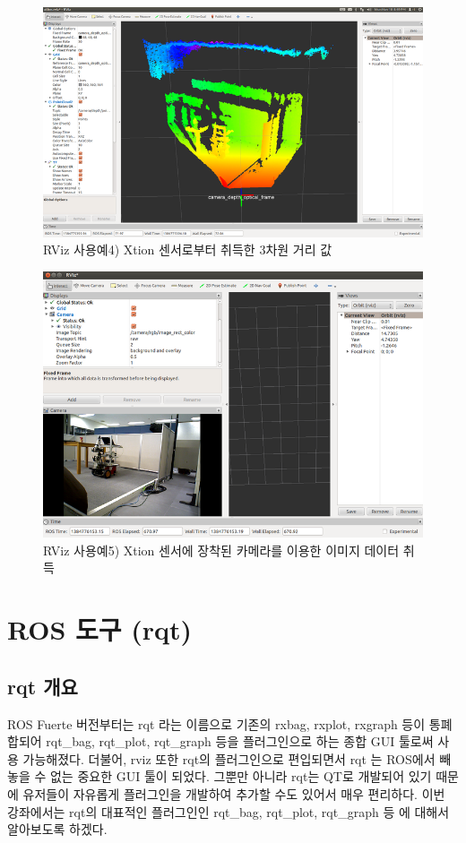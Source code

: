 \begin{figure}[h]
\centering\includegraphics[width=0.7\columnwidth]{pictures/chapter6/rviz_example4.png}
\caption{RViz 사용예4) Xtion 센서로부터 취득한 3차원 거리 값}
\end{figure}

\begin{figure}[h]
\centering\includegraphics[width=0.7\columnwidth]{pictures/chapter6/rviz_example5.png}
\caption{RViz 사용예5) Xtion 센서에 장착된 카메라를 이용한 이미지 데이터 취득}
\end{figure}

\section{ROS 도구 (rqt) }

\subsection{rqt 개요}

ROS Fuerte 버전부터는 rqt 라는 이름으로 기존의 rxbag, rxplot, rxgraph 등이 통폐합되어 rqt\_bag, rqt\_plot, rqt\_graph 등을 플러그인으로 하는 종합 GUI 툴로써 사용 가능해졌다. 더불어, rviz 또한 rqt의 플러그인으로 편입되면서 rqt 는 ROS에서 빼놓을 수 없는 중요한 GUI 툴이 되었다. 그뿐만 아니라 rqt는 QT로 개발되어 있기 때문에 유저들이 자유롭게 플러그인을 개발하여 추가할 수도 있어서 매우 편리하다. 이번 강좌에서는 rqt의 대표적인 플러그인인 rqt\_bag, rqt\_plot, rqt\_graph 등 에 대해서 알아보도록 하겠다.

